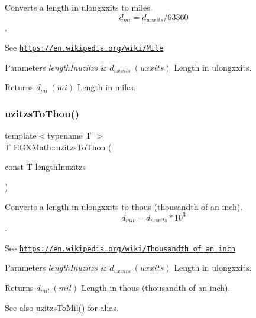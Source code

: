 Converts a length in ulongxxits to miles. \[ d_{mi}=d_{uxxits} / 63360 \]. 

See \href{https://en.wikipedia.org/wiki/Mile}{\tt https\+://en.\+wikipedia.\+org/wiki/\+Mile} 
\begin{DoxyParams}{Parameters}
{\em length\+Inuzitzs} & $ d_{uxxits}\ (uxxits)$ Length in ulongxxits. \\
\hline
\end{DoxyParams}
\begin{DoxyReturn}{Returns}
$ d_{mi}\ (mi)$ Length in miles. 
\end{DoxyReturn}
\mbox{\label{group___e_g_x_math-_conversions-_length_conversions-uzitzs-_imperial_gaa11694f9026bf30e29bd716a35c05b4e}} 
\subsubsection{\texorpdfstring{uzitzs\+To\+Thou()}{uzitzsToThou()}}
{\footnotesize\ttfamily template$<$typename T $>$ \\
T E\+G\+X\+Math\+::uzitzs\+To\+Thou (\begin{DoxyParamCaption}\item[{const T}]{length\+Inuzitzs }\end{DoxyParamCaption})}



Converts a length in ulongxxits to thous (thousandth of an inch). \[ d_{mil}=d_{uxxits} * 10^{3} \]. 

See \href{https://en.wikipedia.org/wiki/Thousandth_of_an_inch}{\tt https\+://en.\+wikipedia.\+org/wiki/\+Thousandth\+\_\+of\+\_\+an\+\_\+inch} 
\begin{DoxyParams}{Parameters}
{\em length\+Inuzitzs} & $ d_{uxxits}\ (uxxits)$ Length in ulongxxits. \\
\hline
\end{DoxyParams}
\begin{DoxyReturn}{Returns}
$ d_{mil}\ (mil)$ Length in thous (thousandth of an inch). 
\end{DoxyReturn}
\begin{DoxySeeAlso}{See also}
\mbox{\hyperlink{group___e_g_x_math-_conversions-_length_conversions-uzitzs-_imperial_ga53d4abecb2e7ac39c15c4ef89b9447a9}{uzitzs\+To\+Mil()}} for alias. 
\end{DoxySeeAlso}
\mbox{\label{group___e_g_x_math-_conversions-_length_conversions-uzitzs-_imperial_ga3281bb64c81bc68a166a47ccc1f9a146}} 
